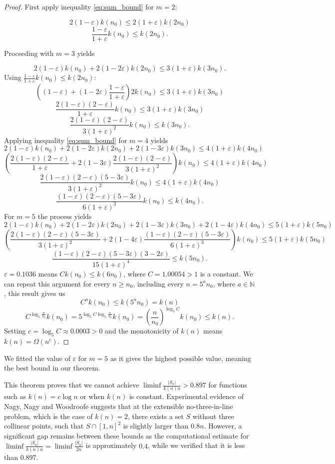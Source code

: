 \documentclass[11pt,a4paper]{article}
\numberwithin{equation}{section}
\newcommand{\nn}{\mathbb{N}}
\begin{document}
\begin{proof}
First apply inequality \ref{eq:sum_bound} for $m=2$:

$$2(1-\varepsilon)k(n_0)\le2(1+\varepsilon)k(2n_0)$$
$$\frac{1-\varepsilon}{1+\varepsilon}k(n_0)\le k(2n_0).$$

Proceeding with $m=3$ yields

$$2(1-\varepsilon)k(n_0)+2(1-2\varepsilon)k(2n_0)\le3(1+\varepsilon)k(3n_0).$$
Using $\frac{1-\varepsilon}{1+\varepsilon}k(n_0)\le k(2n_0)$:
$$\left((1-\varepsilon)+(1-2\varepsilon)\frac{1-\varepsilon}{1+\varepsilon}\right)2k(n_0)\le 3(1+\varepsilon)k(3n_0)$$
$$\frac{2(1-\varepsilon)(2-\varepsilon)}{1+\varepsilon}k(n_0)\le 3(1+\varepsilon)k(3n_0)$$
$$\frac{2(1-\varepsilon)(2-\varepsilon)}{3(1+\varepsilon)^2}k(n_0)\le k(3n_0).$$
Applying inequality \ref{eq:sum_bound} for $m=4$ yields
$$2(1-\varepsilon)k(n_0)+2(1-2\varepsilon)k(2n_0)+2(1-3\varepsilon)k(3n_0)\le4(1+\varepsilon)k(4n_0)$$
$$\left(\frac{2(1-\varepsilon)(2-\varepsilon)}{1+\varepsilon}+2(1-3\varepsilon)\frac{2(1-\varepsilon)(2-\varepsilon)}{3(1+\varepsilon)^2}\right)k(n_0)\le4(1+\varepsilon)k(4n_0)$$
$$\frac{2(1-\varepsilon)(2-\varepsilon)(5-3\varepsilon)}{3(1+\varepsilon)^2}k(n_0)\le 4(1+\varepsilon)k(4n_0)$$
$$\frac{(1-\varepsilon)(2-\varepsilon)(5-3\varepsilon)}{6(1+\varepsilon)^3}k(n_0)\le k(4n_0).$$
For $m=5$ the process yields
$$2(1-\varepsilon)k(n_0)+2(1-2\varepsilon)k(2n_0)+2(1-3\varepsilon)k(3n_0)+2(1-4\varepsilon)k(4n_0)\le5(1+\varepsilon)k(5n_0)$$
$$\left(\frac{2(1-\varepsilon)(2-\varepsilon)(5-3\varepsilon)}{3(1+\varepsilon)^2}+2(1-4\varepsilon)\frac{(1-\varepsilon)(2-\varepsilon)(5-3\varepsilon)}{6(1+\varepsilon)^3}\right)k(n_0)\le 5(1+\varepsilon)k(5n_0)$$
$$\frac{(1-\varepsilon)(2-\varepsilon)(5-3\varepsilon)(3-2\varepsilon)}{15(1+\varepsilon)^4}\le k(5n_0).$$
$\varepsilon=0.1036$ means $Ck(n_0)\le k(6n_0)$, where $C=1.00054>1$ is a constant. We can repeat this argument for every $n\ge n_0$, including every $n=5^an_0$, where $a\in\nn$, this result gives us 
$$C^ak(n_0)\le k(5^an_0)=k(n)$$
$$C^{\log_5\frac{n}{n_0}}k(n_0)=5^{\log_5C\log_5\frac{n}{n_0}}k(n_0)=\left(\frac{n}{n_0}\right)^{\log_5C}k(n_0)\le k(n).$$
Setting $c=\log_5C\approx 0.0003>0$ and the monotonicity of $k(n)$ means $k(n)=\Omega(n^c)$.
    
\end{proof}

We fitted the value of $\varepsilon$ for $m=5$ as it gives the highest possible value, meaning the best bound in our theorem.

This theorem proves that we cannot achieve $\liminf\frac{|S_n|}{k(n) n}>0.897$ for functions such as $k(n)=c\log n$ or when $k(n)$ is constant. Experimental evidence of Nagy, Nagy and Woodroofe \cite{nagy2023extensible} suggests that at the extensible no-three-in-line problem, which is the case of $k(n)=2$, there exists a set $S$ without three collinear points, such that $S\cap[1,n]^2$ is slightly larger than $0.8n$. However, a significant gap remains between these bounds as the computational estimate for $\liminf\frac{|S_n|}{k(n) n}=\liminf\frac{|S_n|}{2 n}$ is approximately $0.4$, while we verified that it is less than $0.897$.
\end{document}

